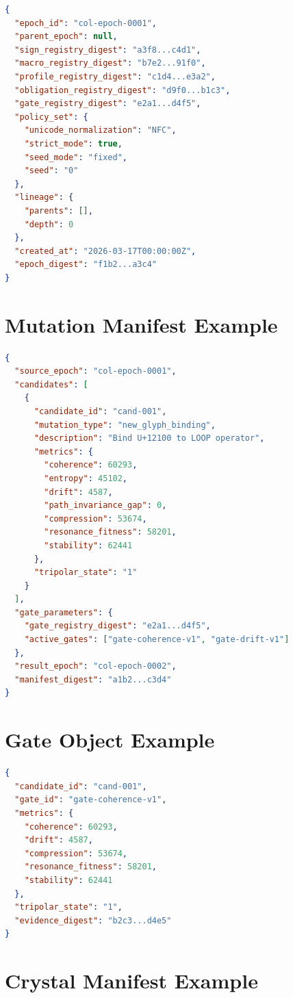 \documentclass[11pt,a4paper,twoside]{article}
\theoremstyle{definition}
\theoremstyle{remark}
\begin{document}
\begin{lstlisting}[language=JSON]
{
  "epoch_id": "col-epoch-0001",
  "parent_epoch": null,
  "sign_registry_digest": "a3f8...c4d1",
  "macro_registry_digest": "b7e2...91f0",
  "profile_registry_digest": "c1d4...e3a2",
  "obligation_registry_digest": "d9f0...b1c3",
  "gate_registry_digest": "e2a1...d4f5",
  "policy_set": {
    "unicode_normalization": "NFC",
    "strict_mode": true,
    "seed_mode": "fixed",
    "seed": "0"
  },
  "lineage": {
    "parents": [],
    "depth": 0
  },
  "created_at": "2026-03-17T00:00:00Z",
  "epoch_digest": "f1b2...a3c4"
}
\end{lstlisting}


\section{Mutation Manifest Example}
\label{app:mutation}

\begin{lstlisting}[language=JSON]
{
  "source_epoch": "col-epoch-0001",
  "candidates": [
    {
      "candidate_id": "cand-001",
      "mutation_type": "new_glyph_binding",
      "description": "Bind U+12100 to LOOP operator",
      "metrics": {
        "coherence": 60293,
        "entropy": 45102,
        "drift": 4587,
        "path_invariance_gap": 0,
        "compression": 53674,
        "resonance_fitness": 58201,
        "stability": 62441
      },
      "tripolar_state": "1"
    }
  ],
  "gate_parameters": {
    "gate_registry_digest": "e2a1...d4f5",
    "active_gates": ["gate-coherence-v1", "gate-drift-v1"]
  },
  "result_epoch": "col-epoch-0002",
  "manifest_digest": "a1b2...c3d4"
}
\end{lstlisting}


\section{Gate Object Example}
\label{app:gate}

\begin{lstlisting}[language=JSON]
{
  "candidate_id": "cand-001",
  "gate_id": "gate-coherence-v1",
  "metrics": {
    "coherence": 60293,
    "drift": 4587,
    "compression": 53674,
    "resonance_fitness": 58201,
    "stability": 62441
  },
  "tripolar_state": "1",
  "evidence_digest": "b2c3...d4e5"
}
\end{lstlisting}


\section{Crystal Manifest Example}
\label{app:crystal}
\end{document}
